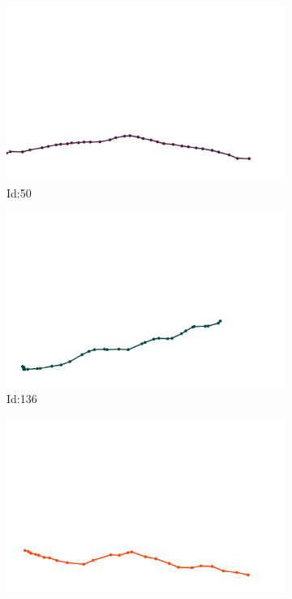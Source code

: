 \documentclass[12pt,twoside]{report}
\begin{document}
\begin{figure}
\centering
\begin{subfigure}[b]{0.20\textwidth}
\centering
\includegraphics[width=\textwidth]{../../trajectories/50.png}
\caption{Id:50}
\end{subfigure}
\begin{subfigure}[b]{0.20\textwidth}
\centering
\includegraphics[width=\textwidth]{../../trajectories/136.png}
\caption{Id:136}
\end{subfigure}
\begin{subfigure}[b]{0.20\textwidth}
\centering
\includegraphics[width=\textwidth]{../../trajectories/188.png}

\end{subfigure}
\end{figure}
\end{document}

